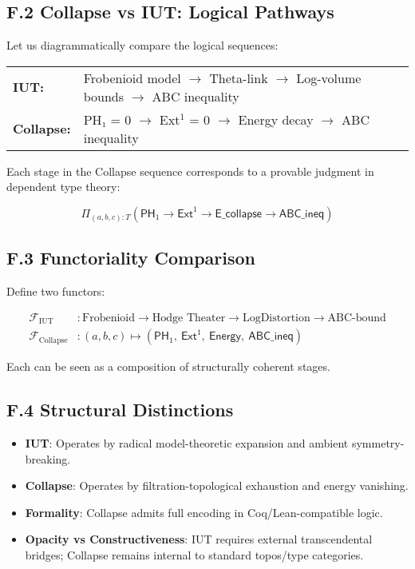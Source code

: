 \documentclass[11pt]{article}
\begin{document}
\subsection*{F.2 Collapse vs IUT: Logical Pathways}

Let us diagrammatically compare the logical sequences:

\begin{center}
\begin{tabular}{ll}
\textbf{IUT:} & Frobenioid model \(\to\) Theta-link \(\to\) Log-volume bounds \(\to\) ABC inequality \\
\textbf{Collapse:} & PH₁ = 0 \(\to\) Ext$^1$ = 0 \(\to\) Energy decay \(\to\) ABC inequality \\
\end{tabular}
\end{center}

Each stage in the Collapse sequence corresponds to a provable judgment in dependent type theory:

\[
\Pi_{(a,b,c):T} \left( \mathsf{PH}_1 \to \mathsf{Ext}^1 \to \mathsf{E\_collapse} \to \mathsf{ABC\_ineq} \right)
\]

\subsection*{F.3 Functoriality Comparison}

Define two functors:

\begin{align*}
\mathcal{F}_{\mathrm{IUT}} &: \text{Frobenioid} \to \text{Hodge Theater} \to \text{LogDistortion} \to \text{ABC-bound} \\
\mathcal{F}_{\mathrm{Collapse}} &: (a,b,c) \mapsto \left( \mathsf{PH}_1,\ \mathsf{Ext}^1,\ \mathsf{Energy},\ \mathsf{ABC\_ineq} \right)
\end{align*}

Each can be seen as a composition of structurally coherent stages.

\subsection*{F.4 Structural Distinctions}

\begin{itemize}
  \item \textbf{IUT}: Operates by radical model-theoretic expansion and ambient symmetry-breaking.
  \item \textbf{Collapse}: Operates by filtration-topological exhaustion and energy vanishing.
  \item \textbf{Formality}: Collapse admits full encoding in Coq/Lean-compatible logic.
  \item \textbf{Opacity vs Constructiveness}: IUT requires external transcendental bridges; Collapse remains internal to standard topos/type categories.
\end{itemize}
\end{document}
